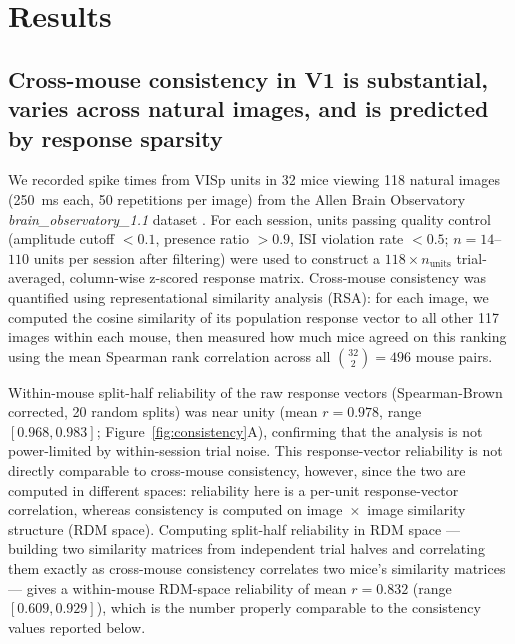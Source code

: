 \documentclass[11pt,onecolumn]{article}
\begin{document}
\section{Results}

\subsection{Cross-mouse consistency in V1 is substantial, varies across
natural images, and is predicted by response sparsity}

We recorded spike times from VISp units in 32 mice viewing 118 natural
images (250~ms each, 50 repetitions per image) from the Allen Brain
Observatory \textit{brain\_observatory\_1.1} dataset \citep{siegle2021}.
For each session, units passing quality control (amplitude cutoff $< 0.1$,
presence ratio $> 0.9$, ISI violation rate $< 0.5$; $n = 14$--$110$ units
per session after filtering) were used to construct a
$118 \times n_\mathrm{units}$ trial-averaged, column-wise z-scored response
matrix.  Cross-mouse consistency was quantified using representational
similarity analysis (RSA): for each image, we computed the cosine
similarity of its population response vector to all other 117 images
within each mouse, then measured how much mice agreed on this ranking
using the mean Spearman rank correlation across all
$\binom{32}{2} = 496$ mouse pairs.

Within-mouse split-half reliability of the raw response vectors
(Spearman-Brown corrected, 20 random splits) was near unity
(mean $r = 0.978$, range $[0.968, 0.983]$; Figure~\ref{fig:consistency}A),
confirming that the analysis is not power-limited by within-session
trial noise.  This response-vector reliability is not directly comparable
to cross-mouse consistency, however, since the two are computed in
different spaces: reliability here is a per-unit response-vector
correlation, whereas consistency is computed on image~$\times$~image
similarity structure (RDM space).  Computing split-half reliability in
RDM space --- building two similarity matrices from independent trial
halves and correlating them exactly as cross-mouse consistency
correlates two mice's similarity matrices --- gives a within-mouse
RDM-space reliability of mean $r = 0.832$ (range $[0.609, 0.929]$),
which is the number properly comparable to the consistency values
reported below.
\end{document}
